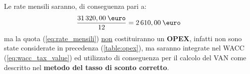 Le rate mensili saranno, di conseguenza pari a:
 	\begin{equation}
	\label{eq:rate_mensili}
	\begin{split}
		\frac{31\thinspace 320,00 \: \mbox{\euro}}{12} = 2\thinspace 610,00 \: \mbox{\euro}
	\end{split}
	\end{equation}
ma la quota (\ref{eq:rate_mensili}) \underline{non} costituiranno un \textbf{OPEX}, infatti non sono state considerate in precedenza (\ref{table:opex}), ma saranno integrate nel \ac{WACC} (\ref{eq:wacc_tax_value}) ed utilizzato di conseguenza per il calcolo del \ac{VAN} come descritto nel \textbf{metodo del tasso di sconto corretto}.	

